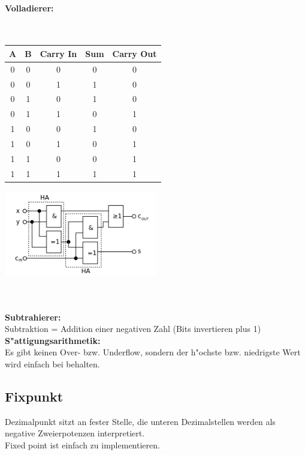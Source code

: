 \paragraph{Volladierer:}~\\
\begin{minipage}{0.5\textwidth}
	\begin{tabular}{|c | c | c | c | c |}
		\hline
		A & B & Carry In & Sum & Carry Out\\
		\hline
		0 & 0 & 0 & 0 & 0\\
		\hline
		0 & 0 & 1 & 1 & 0\\
		\hline
		0 & 1 & 0 & 1 & 0\\
		\hline
		0 & 1 & 1 & 0 & 1\\
		\hline
		1 & 0 & 0 & 1 & 0\\
		\hline
		1 & 0 & 1 & 0 & 1\\
		\hline
		1 & 1 & 0 & 0 & 1\\
		\hline
		1 & 1 & 1 & 1 & 1\\
		\hline
	\end{tabular}
\end{minipage}
\begin{minipage}{0.9\textwidth}
	\begin{flushleft}
		{\includegraphics[width=0.5\textwidth]{images/Arithmetik/volladdierer.png}}
		\label{Fig: Volladdierer}
	\end{flushleft}
\end{minipage}\\ \\

\textbf{Subtrahierer:}\\
Subtraktion = Addition einer negativen Zahl (Bits invertieren plus 1)\\

\textbf{S"attigungsarithmetik:}\\
Es gibt keinen Over- bzw. Underflow, sondern der h"ochste bzw. niedrigste Wert wird einfach bei behalten.
\subsection{Fixpunkt}
Dezimalpunkt sitzt an fester Stelle, die unteren Dezimalstellen werden als negative Zweierpotenzen interpretiert. \\
Fixed point ist einfach zu implementieren. 
